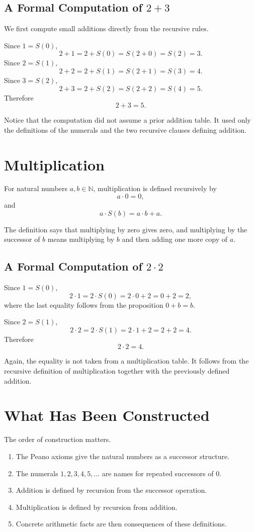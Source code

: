 \subsection*{A Formal Computation of \(2+3\)}

We first compute small additions directly from the recursive rules.

Since \(1=S(0)\),
\[
2+1=2+S(0)=S(2+0)=S(2)=3.
\]
Since \(2=S(1)\),
\[
2+2=2+S(1)=S(2+1)=S(3)=4.
\]
Since \(3=S(2)\),
\[
2+3=2+S(2)=S(2+2)=S(4)=5.
\]
Therefore
\[
\boxed{2+3=5}.
\]

Notice that the computation did not assume a prior addition table. It used only
the definitions of the numerals and the two recursive clauses defining addition.

\section{Multiplication}

\begin{definitionbox}
For natural numbers \(a,b\in\mathbb{N}\), multiplication is defined recursively
by
\[
a\cdot 0=0,
\]
and
\[
a\cdot S(b)=a\cdot b+a.
\]
\end{definitionbox}

The definition says that multiplying by zero gives zero, and multiplying by the
successor of \(b\) means multiplying by \(b\) and then adding one more copy of
\(a\).

\subsection*{A Formal Computation of \(2\cdot 2\)}

Since \(1=S(0)\),
\[
2\cdot 1=2\cdot S(0)=2\cdot 0+2=0+2=2,
\]
where the last equality follows from the proposition \(0+b=b\).

Since \(2=S(1)\),
\[
2\cdot 2=2\cdot S(1)=2\cdot 1+2=2+2=4.
\]
Therefore
\[
\boxed{2\cdot 2=4}.
\]

Again, the equality is not taken from a multiplication table. It follows from
the recursive definition of multiplication together with the previously defined
addition.

\section{What Has Been Constructed}

The order of construction matters.

\begin{enumerate}
    \item The Peano axioms give the natural numbers as a successor structure.
    \item The numerals \(1,2,3,4,5,\ldots\) are names for repeated successors of
    \(0\).
    \item Addition is defined by recursion from the successor operation.
    \item Multiplication is defined by recursion from addition.
    \item Concrete arithmetic facts are then consequences of these definitions.
\end{enumerate}

